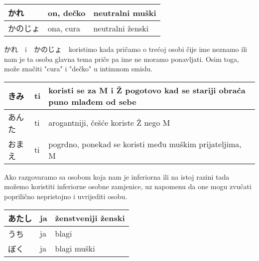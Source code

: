 	
	\begin{tabular}{|l|l|l|}
		\hline
		かれ&on, dečko&neutralni muški\\\hline
		かのじょ&ona, cura&neutralni ženski\\\hline
	\end{tabular}
	
	\vspace{10pt}
	
	かれ　i　かのじょ　koristimo kada pričamo o trećoj osobi čije ime neznamo ili nam je ta osoba glavna tema priče pa ime ne moramo ponavljati. Osim toga, može značiti "cura" i "dečko" u intimnom smislu.
	
	\begin{reibun}
	\end{reibun}
	
	\begin{tabular}{|l|l|l|}
		\hline
		きみ\footnotemark[2]&ti&koristi se za M i Ž pogotovo kad se stariji obraća puno mlađem od sebe\\\hline
		あんた&ti&arogantniji, češće koriste Ž nego M\\\hline
		おまえ&ti&pogrdno, ponekad se koristi među muškim prijateljima, M\\\hline
	\end{tabular}	
	
	\vspace{10pt}
	
		Ako razgovaramo sa osobom koja nam je inferiorna ili na istoj razini tada možemo koristiti inferiorne osobne zamjenice, uz napomenu da one mogu zvučati poprilično nepristojno i uvrijediti osobu.
		
		\vspace{15pt}
	
	\newpage
		
	\begin{tabular}{|l|l|l|}
		\hline
		あたし&ja&ženstveniji ženski\\\hline
		うち&ja&blagi\\\hline
		ぼく&ja&blagi muški\\\hline
	\end{tabular}
	
